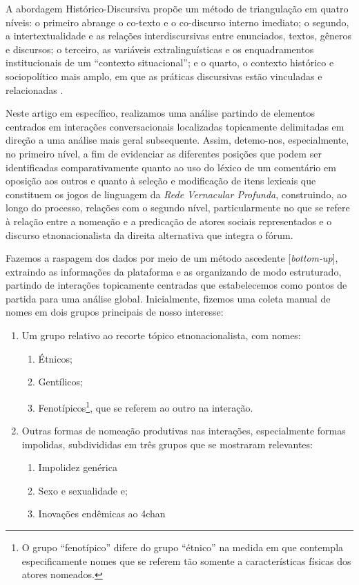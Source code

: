 \documentclass[portuguese]{textolivre}
\begin{document}
A abordagem Histórico-Discursiva propõe um método de triangulação em quatro níveis: o primeiro abrange o co-texto e o co-discurso interno imediato; o segundo, a intertextualidade e as relações interdiscursivas entre enunciados, textos, gêneros e discursos; o terceiro, as variáveis extralinguísticas e os enquadramentos institucionais de um “contexto situacional”; e o quarto, o contexto histórico e sociopolítico mais amplo, em que as práticas discursivas estão vinculadas e relacionadas \cite[p. 93]{wodakreisigl2016}.

Neste artigo em específico, realizamos uma análise partindo de elementos centrados em interações conversacionais localizadas topicamente delimitadas em direção a uma análise mais geral subsequente. Assim, detemo-nos, especialmente, no primeiro nível, a fim de evidenciar as diferentes posições que podem ser identificadas comparativamente quanto ao uso do léxico de um comentário em oposição aos outros e quanto à seleção e modificação de itens lexicais que constituem os jogos de linguagem da \emph{Rede Vernacular Profunda}, construindo, ao longo do processo, relações com o segundo nível, particularmente no que se refere à relação entre a nomeação e a predicação de atores sociais representados e o discurso etnonacionalista da direita alternativa que integra o fórum.

Fazemos a raspagem dos dados por meio de um método ascedente [\emph{bottom-up}], extraindo as informações da plataforma e as organizando de modo estruturado, partindo de interações topicamente centradas que estabelecemos como pontos de partida para uma análise global. Inicialmente, fizemos uma coleta manual de nomes em dois grupos principais de nosso interesse:

\begin{enumerate}
    \item Um grupo relativo ao recorte tópico etnonacionalista, com nomes:
\begin{enumerate}[label=\alph*)]
    \item Étnicos;
    \item Gentílicos;
    \item Fenotípicos\footnote{O grupo “fenotípico” difere do grupo “étnico” na medida em que contempla especificamente nomes que se referem tão somente a características físicas dos atores nomeados.}, que se referem ao outro na interação.
\end{enumerate}
\item Outras formas de nomeação produtivas nas interações, especialmente formas impolidas, subdivididas em três grupos que se mostraram relevantes: 
\begin{enumerate}[label=\alph*)]
    \item Impolidez genérica
    \item Sexo e sexualidade e;
    \item Inovações endêmicas ao 4chan
\end{enumerate}
\end{enumerate}
\end{document}
